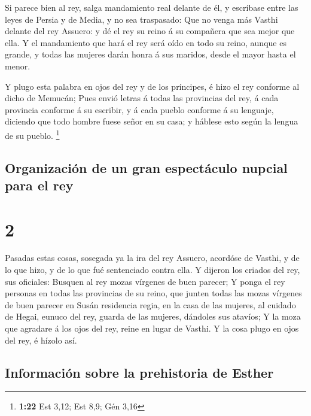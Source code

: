  Si parece bien al rey, salga mandamiento real delante de
él, y escríbase entre las leyes de Persia y de Media, y no sea
traspasado: Que no venga más Vasthi delante del rey Assuero: y dé el rey
su reino á su compañera que sea mejor que ella.  Y el
mandamiento que hará el rey será oído en todo su reino, aunque es
grande, y todas las mujeres darán honra á sus maridos, desde el mayor
hasta el menor.

 Y plugo esta palabra en ojos del rey y de los príncipes, é
hizo el rey conforme al dicho de Memucán;  Pues envió
letras á todas las provincias del rey, á cada provincia conforme á su
escribir, y á cada pueblo conforme á su lenguaje, diciendo que todo
hombre fuese señor en su casa; y háblese esto según la lengua de su
pueblo. \footnote{\textbf{1:22} Est 3,12; Est 8,9; Gén 3,16}

\hypertarget{organizaciuxf3n-de-un-gran-espectuxe1culo-nupcial-para-el-rey}{%
\subsection{Organización de un gran espectáculo nupcial para el
rey}\label{organizaciuxf3n-de-un-gran-espectuxe1culo-nupcial-para-el-rey}}

\hypertarget{section-1}{%
\section{2}\label{section-1}}

 Pasadas estas cosas, sosegada ya la ira del rey Assuero,
acordóse de Vasthi, y de lo que hizo, y de lo que fué sentenciado contra
ella.  Y dijeron los criados del rey, sus oficiales: Busquen
al rey mozas vírgenes de buen parecer;  Y ponga el rey
personas en todas las provincias de su reino, que junten todas las mozas
vírgenes de buen parecer en Susán residencia regia, en la casa de las
mujeres, al cuidado de Hegai, eunuco del rey, guarda de las mujeres,
dándoles sus atavíos;  Y la moza que agradare á los ojos del
rey, reine en lugar de Vasthi. Y la cosa plugo en ojos del rey, é hízolo
así.

\hypertarget{informaciuxf3n-sobre-la-prehistoria-de-esther}{%
\subsection{Información sobre la prehistoria de
Esther}\label{informaciuxf3n-sobre-la-prehistoria-de-esther}}

